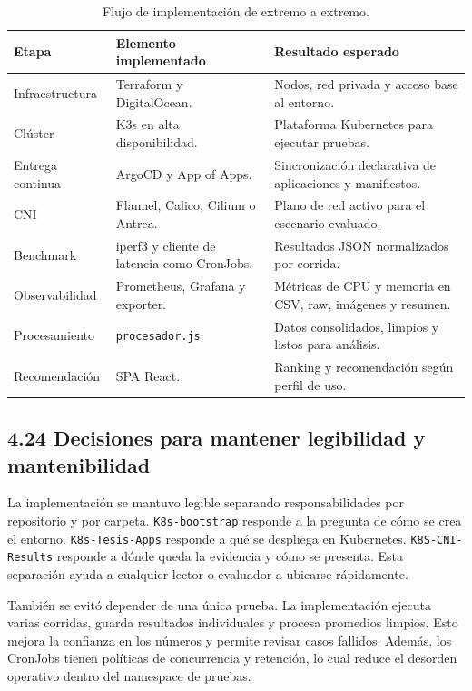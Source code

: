 \begin{table}[htbp]
\centering
\scriptsize
\caption{Flujo de implementación de extremo a extremo.}
\label{tab:flujo-implementacion}
\begin{tabularx}{\textwidth}{|Y|Y|Y|}
\hline
\textbf{Etapa} & \textbf{Elemento implementado} & \textbf{Resultado esperado} \\
\hline
Infraestructura & Terraform y DigitalOcean. & Nodos, red privada y acceso base al entorno. \\
\hline
Clúster & K3s en alta disponibilidad. & Plataforma Kubernetes para ejecutar pruebas. \\
\hline
Entrega continua & ArgoCD y App of Apps. & Sincronización declarativa de aplicaciones y manifiestos. \\
\hline
CNI & Flannel, Calico, Cilium o Antrea. & Plano de red activo para el escenario evaluado. \\
\hline
Benchmark & iperf3 y cliente de latencia como CronJobs. & Resultados JSON normalizados por corrida. \\
\hline
Observabilidad & Prometheus, Grafana y exporter. & Métricas de CPU y memoria en CSV, raw, imágenes y resumen. \\
\hline
Procesamiento & \texttt{procesador.js}. & Datos consolidados, limpios y listos para análisis. \\
\hline
Recomendación & SPA React. & Ranking y recomendación según perfil de uso. \\
\hline
\end{tabularx}
\end{table}

\subsection{4.24 Decisiones para mantener legibilidad y mantenibilidad}

La implementación se mantuvo legible separando responsabilidades por repositorio y por carpeta. \texttt{K8s-bootstrap} responde a la pregunta de cómo se crea el entorno. \texttt{K8s-Tesis-Apps} responde a qué se despliega en Kubernetes. \texttt{K8S-CNI-Results} responde a dónde queda la evidencia y cómo se presenta. Esta separación ayuda a cualquier lector o evaluador a ubicarse rápidamente.

También se evitó depender de una única prueba. La implementación ejecuta varias corridas, guarda resultados individuales y procesa promedios limpios. Esto mejora la confianza en los números y permite revisar casos fallidos. Además, los CronJobs tienen políticas de concurrencia y retención, lo cual reduce el desorden operativo dentro del namespace de pruebas.

